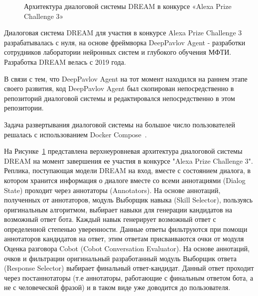 \begin{figure}[ht]
  \caption{Архитектура диалоговой системы {DREAM} в конкурсе «Alexa Prize Challenge 3»}\label{fig:Alexa1}
\end{figure}


Диалоговая система {DREAM} для участия в конкурсе Alexa Prize Challenge 3 разрабатывалась с нуля, на основе фреймворка DeepPavlov Agent -  разработки сотрудников лаборатории нейронных систем и глубокого обучения МФТИ. Разработка {DREAM} велась с 2019 года.

В связи с тем, что DeepPavlov Agent на тот момент находился на раннем этапе своего развития, код DeepPavlov Agent был скопирован непосредственно в репозиторий диалоговой системы и редактировался непосредственно в этом репозитории.

Задача развертывания диалоговой системы на большое число пользователей решалась с использованием Docker Compose~\cite{na_website_ndk}.

На Рисунке~\ref{fig:Alexa1} представлена верхнеуровневая архитектура диалоговой системы {DREAM} на момент завершения ее участия в конкурсе "Alexa Prize Challenge 3". Реплика, поступающая модели {DREAM} на вход, вместе с состоянием диалога, в котором хранится информация о диалоге вместе со всеми аннотациями (Dialog State) проходит через аннотаторы (Annotators). На основе аннотаций, полученных от аннотаторов, модуль Выборщик навыка (Skill Selector), пользуясь оригинальным алгоритмом, выбирает навыки для генерации кандидатов на возможный ответ бота. Каждый навык генерирует возможный ответ с определенной степенью уверенности. Данные ответы фильтруются при помощи аннотаторов кандидатов на ответ, этим ответам присваиваются очки от модуля Оценка разговора Cobot (Cobot Conversation Evaluator). На основе аннотаций, очков и фильтрации оригинальный разработанный модуль Выборщик ответа (Response Selector) выбирает финальный ответ-кандидат. Данный ответ проходит через постаннотаторы (т.е аннотаторы, работающие с финальным ответом бота, а не с человеческой фразой) и в таком виде уже доводится до пользователя.

